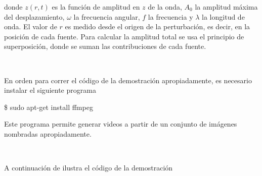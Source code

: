 donde $z(r, t)$ es la función de amplitud en $z$ de la onda, $A_0$ la 
amplitud máxima del desplazamiento, $\omega$ la frecuencia angular, $f$ la 
frecuencia y $\lambda$ la longitud de onda. El valor de $r$ es medido desde 
el origen de la perturbación, es decir, en la posición de cada fuente.
Para calcular la amplitud total se usa el principio de superposición, donde
se suman las contribuciones de cada fuente.

\

En orden para correr el código de la demostración apropiadamente, es 
necesario instalar el siguiente programa

\begin{listing}[style=consola, numbers=none]
\$ sudo apt-get install ffmpeg
\end{listing}

Este programa permite generar videos a partir de un conjunto de imágenes
nombradas apropiadamente.

\

A continuación de ilustra el código de la demostración


